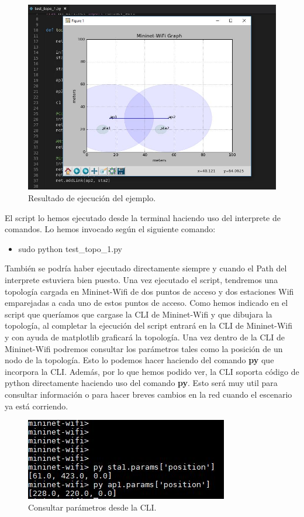 \begin{figure}[!htb]
  \centering
    \includegraphics[width=0.9\linewidth]{./img/test/19.JPG}
    \caption{Resultado de ejecución del ejemplo.}
  \label{fig:yo}
\end{figure}
El script lo hemos ejecutado desde la terminal haciendo uso del interprete de comandos. Lo hemos invocado según el siguiente comando:
\begin{itemize}
    \item sudo python test\_topo\_1.py
\end{itemize}
También se podría haber ejecutado directamente siempre y cuando el Path del interprete estuviera bien puesto. Una vez ejecutado el script, tendremos una topología cargada en Mininet-Wifi de dos puntos de acceso y dos estaciones Wifi emparejadas a cada uno de estos puntos de acceso. \newline
\newline
Como hemos indicado en el script que queríamos que cargase la CLI de Mininet-Wifi y que dibujara la topología, al completar la ejecución del script entrará en la CLI de Mininet-Wifi y con ayuda de matplotlib graficará la topología.
Una vez dentro de la CLI de Mininet-Wifi podremos consultar los parámetros tales como la posición de un nodo de la topología. Esto lo podemos hacer haciendo del comando \textbf{py} que incorpora la CLI. Además, por lo que hemos podido ver, la CLI soporta código de python directamente haciendo uso del comando \textbf{py}. Esto será muy util para consultar información o para hacer breves cambios en la red cuando el escenario ya está corriendo.
\newpage
\begin{figure}[!htb]
  \centering
    \includegraphics[width=0.6\linewidth]{./img/test/20.JPG}
    \caption{Consultar parámetros desde la CLI.}
  \label{fig:yo}
\end{figure}

